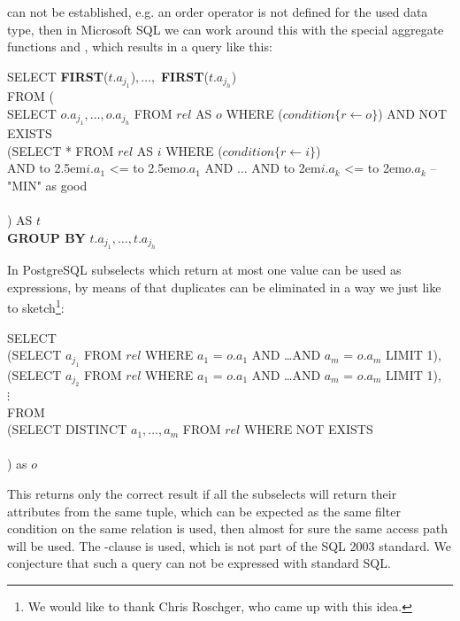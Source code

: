 can not be established, e.g. an order operator is not defined for the
used data type, then in Microsoft SQL we can work around this with the
special aggregate functions  and ,
which results in a query like this:
%
\begin{sql}
\newcommand\abox[1]{\hbox to 2.5em{#1\hfil}}%
\newcommand\bbox[1]{\hbox to 2em{#1\hfil}}%
SELECT \textbf{FIRST}($t.a_{j_1}$)$, \ldots, $ \textbf{FIRST}($t.a_{j_h}$) \\
FROM (\\
SELECT $o.a_{j_1}, \ldots, o.a_{j_h}$ FROM $rel$ AS $o$ WHERE ($condition\{r \gets o\}$) AND NOT EXISTS \\
(SELECT * FROM $rel$ AS $i$ WHERE ($condition\{r \gets i\}$) \\
AND \abox{$i.a_1$} <= \abox{$o.a_1$} AND $\ldots$ AND \bbox{$i.a_k$} <= \bbox{$o.a_k$} -- "MIN" as good\\
 \\
) AS $t$ \\
\textbf{GROUP BY} $t.a_{j_1}, \ldots, t.a_{j_h}$
\end{sql}

In PostgreSQL subselects which return at most one value can be used as
expressions, by means of that duplicates can be eliminated in a way we
just like to sketch\footnote{We would like to thank Chris Roschger,
who came up with this idea.}:

\begin{sql}
SELECT \\
(SELECT $a_{j_1}$ FROM $rel$ WHERE $a_1$ = $o.a_1$ AND \ldots AND $a_m$ = $o.a_m$ LIMIT 1), \\
(SELECT $a_{j_2}$ FROM $rel$ WHERE $a_1$ = $o.a_1$ AND \ldots AND $a_m$ = $o.a_m$ LIMIT 1), \\
$\vdots$ \\
FROM\\
(SELECT DISTINCT $a_1, \ldots, a_m$ FROM $rel$ WHERE NOT EXISTS\\
 \\
) as $o$
\end{sql}

This returns only the correct result if all the subselects will return
their attributes from the same tuple, which can be expected as the same
filter condition on the same relation is used, then almost for sure
the same access path will be used.  The -clause is
used, which is not part of the SQL 2003 standard. We conjecture that
such a query can not be expressed with standard SQL.

